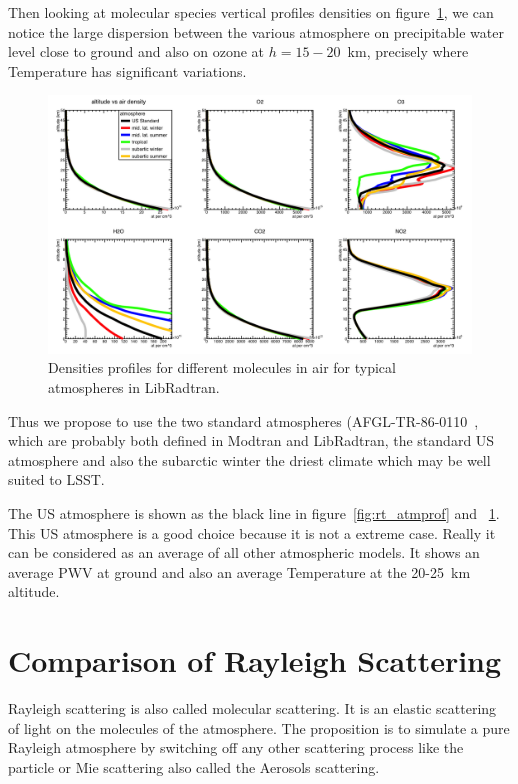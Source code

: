 \documentclass[a4paper]{article}
\begin{document}
Then looking at molecular species vertical profiles densities on figure~\ref{fig:rt_atm_densities}, we can notice the large dispersion between the various atmosphere on precipitable water level close to ground and also on ozone at $h=15-20$~km, precisely where Temperature has significant variations.
\begin{figure}
\centering
\includegraphics[width=1\textwidth]{images/rt_atm_densities.png}
\caption{\label{fig:rt_atm_densities}Densities profiles for different molecules in air for typical atmospheres in LibRadtran.}
\end{figure}

Thus we propose to use the two standard atmospheres (AFGL-TR-86-0110~\cite{AFGL76}, which are probably both defined in Modtran and LibRadtran, 
the standard US atmosphere and also the subarctic winter the driest  climate which may be well suited to LSST. 
 
 
The US atmosphere is shown as the black line in figure~\ref{fig:rt_atmprof} and ~\ref{fig:rt_atm_densities}. 
This US atmosphere is a good choice because it is not a extreme case. 
Really it can be considered as an average of all other atmospheric models. It shows an average PWV at ground and also an average Temperature at the  20-25~km altitude.

\section{Comparison of Rayleigh Scattering}

Rayleigh scattering is also called molecular scattering. It is an elastic scattering of light on the molecules of the atmosphere. 
The proposition is to simulate a pure Rayleigh atmosphere by switching off any other scattering process like the particle or Mie scattering also called the Aerosols scattering.
\end{document}
